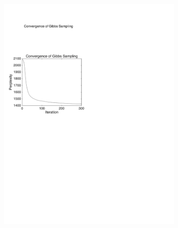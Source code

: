 \documentclass{article} %
\begin{document}
\begin{figure}
\begin{subfigure}{.5\linewidth}
\centering
\includegraphics[width=1\textwidth]{AP_topics_10_GS_Perplexity}
\end{subfigure}%
\begin{subfigure}{.5\linewidth}
\centering

\end{subfigure}
\end{figure}
\end{document}
